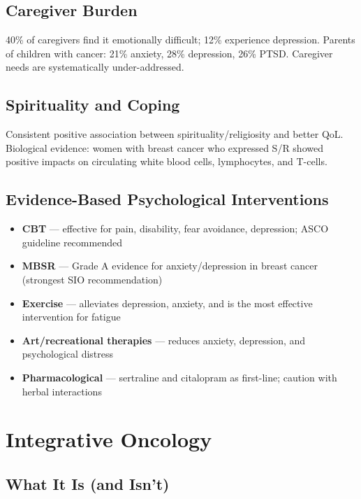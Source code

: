 \subsection{Caregiver Burden}\label{caregiver-burden}

40\% of caregivers find it emotionally difficult; 12\% experience
depression. Parents of children with cancer: 21\% anxiety, 28\%
depression, 26\% PTSD. Caregiver needs are systematically
under-addressed.

\subsection{Spirituality and Coping}\label{spirituality-and-coping}

Consistent positive association between spirituality/religiosity and
better QoL. Biological evidence: women with breast cancer who expressed
S/R showed positive impacts on circulating white blood cells,
lymphocytes, and T-cells.

\subsection{Evidence-Based Psychological
Interventions}\label{evidence-based-psychological-interventions}

\begin{itemize}
\tightlist
\item
  \textbf{CBT} --- effective for pain, disability, fear avoidance,
  depression; ASCO guideline recommended
\item
  \textbf{MBSR} --- Grade A evidence for anxiety/depression in breast
  cancer (strongest SIO recommendation)
\item
  \textbf{Exercise} --- alleviates depression, anxiety, and is the most
  effective intervention for fatigue
\item
  \textbf{Art/recreational therapies} --- reduces anxiety, depression,
  and psychological distress
\item
  \textbf{Pharmacological} --- sertraline and citalopram as first-line;
  caution with herbal interactions
\end{itemize}

\newpage

\section{Integrative Oncology}\label{integrative-oncology}

\subsection{What It Is (and Isn't)}\label{what-it-is-and-isnt}

